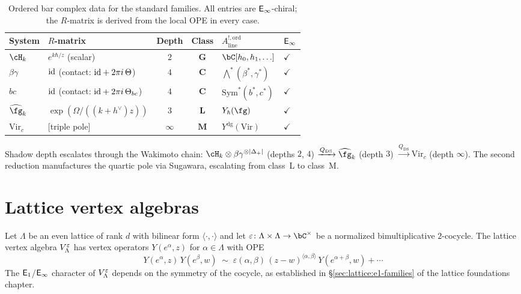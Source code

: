 \begin{table}[ht]
\centering
\renewcommand{\arraystretch}{1.4}
\begin{tabular}{llccll}
\toprule
\textbf{System} & \textbf{$R$-matrix}
 & \textbf{Depth} & \textbf{Class}
 & \textbf{$A^{!,\mathrm{ord}}_{\mathrm{line}}$}
 & \textbf{$\mathsf{E}_{\infty}$}\\
\midrule
$\cH_k$ & $e^{k\hbar/z}$ \textup{(scalar)}
 & $2$ & $\mathbf{G}$ & $\bC[h_0,h_1,\ldots]$
 & $\checkmark$ \\[2pt]
$\beta\gamma$ & $\mathrm{id}$ \textup{(contact: }$\mathrm{id} + 2\pi i\,\Theta$\textup{)}
 & $4$ & $\mathbf{C}$
 & $\bigwedge^*(\beta^*,\gamma^*)$
 & $\checkmark$ \\[2pt]
$bc$ & $\mathrm{id}$ \textup{(contact: }$\mathrm{id} + 2\pi i\,\Theta_{bc}$\textup{)}
 & $4$ & $\mathbf{C}$
 & $\mathrm{Sym}^*(b^*,c^*)$
 & $\checkmark$ \\[2pt]
$\widehat{\fg}_k$ & $\exp(\Omega/((k+h^\vee)z))$
 & $3$ & $\mathbf{L}$ & $Y_\hbar(\fg)$
 & $\checkmark$ \\[2pt]
$\mathrm{Vir}_c$ & \textup{[triple pole]}
 & $\infty$ & $\mathbf{M}$ & $Y^{\mathrm{dg}}(\mathrm{Vir})$
 & $\checkmark$ \\
\bottomrule
\end{tabular}
\caption{Ordered bar complex data for the standard families.
All entries are $\mathsf{E}_{\infty}$-chiral; the $R$-matrix is derived
from the local OPE in every case.}
\label{tab:free-field-contrast}
\end{table}

\begin{remark}
\label{rem:wakimoto-escalation}
Shadow depth escalates through the Wakimoto chain:
$\cH_k \otimes \beta\gamma^{\otimes |\Delta_+|}$
(depths $2$, $4$)
$\xrightarrow{Q_{\mathrm{DS}}} \widehat{\fg}_k$
(depth $3$)
$\xrightarrow{Q_{\mathrm{DS}}} \mathrm{Vir}_c$
(depth $\infty$).
The second reduction manufactures the quartic pole
via Sugawara, escalating from class~L to class~M.
\end{remark}

\section{Lattice vertex algebras}
\label{subsec:lattice-ordered-bar}

Let $\Lambda$ be an even lattice of rank $d$ with bilinear form
$\langle\cdot,\cdot\rangle$ and let $\varepsilon \colon \Lambda \times
\Lambda \to \bC^\times$ be a normalized bimultiplicative $2$-cocycle.
The lattice vertex algebra $V_\Lambda^\varepsilon$ has vertex operators
$Y(e^\alpha, z)$ for $\alpha \in \Lambda$ with OPE
\begin{equation}\label{eq:lattice-ope-ordered}
Y(e^\alpha, z)\,Y(e^\beta, w) \;\sim\;
 \varepsilon(\alpha,\beta)\,(z - w)^{\langle\alpha,\beta\rangle}\,
 Y(e^{\alpha+\beta}, w) + \cdots
\end{equation}
The $\mathsf{E}_1$/$\mathsf{E}_{\infty}$ character of $V_\Lambda^\varepsilon$ depends on
the symmetry of the cocycle, as established in
\S\ref{sec:lattice:e1-families} of the lattice foundations chapter.

